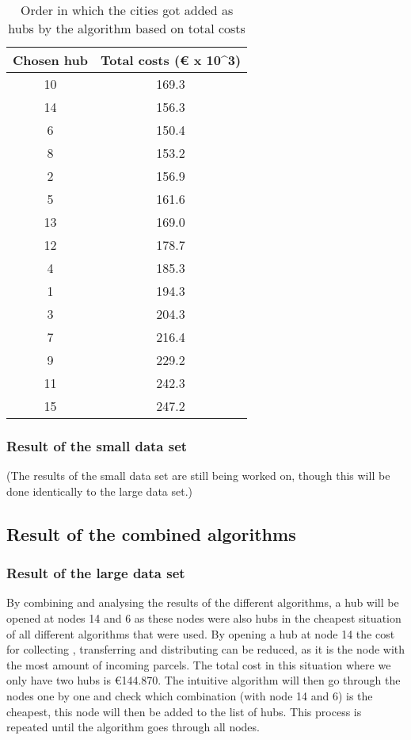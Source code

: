 \documentclass{article}
\begin{document}
\begin{table}[h]
\centering
\begin{tabular}{||c|c||}
\hline
    Chosen hub & Total costs (€ x 10^3) \\
\hline
\hline
    10 & 169.3 \\
    \hline
    14 & 156.3 \\
    \hline
    6 & 150.4 \\
    \hline
    8 & 153.2 \\
    \hline
    2 & 156.9 \\
    \hline
    5 & 161.6 \\
    \hline
    13 & 169.0 \\
    \hline
    12 & 178.7 \\
    \hline
    4 & 185.3 \\
    \hline
    1 & 194.3 \\
    \hline
    3 & 204.3 \\
    \hline
    7 & 216.4 \\
    \hline
    9 & 229.2 \\
    \hline
    11 & 242.3 \\
    \hline
    15 & 247.2 \\
    \hline
\end{tabular}

\caption{\centering Order in which the cities got added as hubs by the algorithm based on total costs}
\label{DistAlg2}
\end{table}
\subsubsection{Result of the small data set}
(The results of the small data set are still being worked on, though this will be done identically to the large data set.)




\newpage

    
    \subsection{Result of the combined algorithms}
    \subsubsection{Result of the large data set}
By combining and analysing the results of the different algorithms, a hub will be opened at nodes 14 and 6 as these nodes were also hubs in the cheapest situation of all different algorithms that were used. By opening a hub at node 14 the cost for collecting , transferring and distributing can be reduced, as it is the node with the most amount of incoming parcels. The total cost in this situation where we only have two hubs is €144.870. The intuitive algorithm will then go through the nodes one by one and check which combination (with node 14 and 6) is the cheapest, this node will then be added to the list of hubs. This process is repeated until the algorithm goes through all nodes. 
\end{document}
